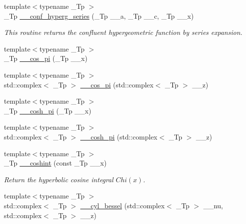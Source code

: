 \begin{DoxyCompactItemize}
{\footnotesize template$<$typename \+\_\+\+Tp $>$ }\\\+\_\+\+Tp \hyperlink{namespacestd_1_1____detail_a5f701a63e17238132405dd209660fc1d}{\+\_\+\+\_\+conf\+\_\+hyperg\+\_\+series} (\+\_\+\+Tp \+\_\+\+\_\+a, \+\_\+\+Tp \+\_\+\+\_\+c, \+\_\+\+Tp \+\_\+\+\_\+x)
\begin{DoxyCompactList}\small\item\em This routine returns the confluent hypergeometric function by series expansion. \end{DoxyCompactList}\item 
{\footnotesize template$<$typename \+\_\+\+Tp $>$ }\\\+\_\+\+Tp \hyperlink{namespacestd_1_1____detail_abfdaa500e1321747a0ad391ca3416a0b}{\+\_\+\+\_\+cos\+\_\+pi} (\+\_\+\+Tp \+\_\+\+\_\+x)
\item 
{\footnotesize template$<$typename \+\_\+\+Tp $>$ }\\std\+::complex$<$ \+\_\+\+Tp $>$ \hyperlink{namespacestd_1_1____detail_a0332c7fb29ed7be543103adc8d04d39d}{\+\_\+\+\_\+cos\+\_\+pi} (std\+::complex$<$ \+\_\+\+Tp $>$ \+\_\+\+\_\+z)
\item 
{\footnotesize template$<$typename \+\_\+\+Tp $>$ }\\\+\_\+\+Tp \hyperlink{namespacestd_1_1____detail_ae6e440447e88191b3cd19daaf7fda96e}{\+\_\+\+\_\+cosh\+\_\+pi} (\+\_\+\+Tp \+\_\+\+\_\+x)
\item 
{\footnotesize template$<$typename \+\_\+\+Tp $>$ }\\std\+::complex$<$ \+\_\+\+Tp $>$ \hyperlink{namespacestd_1_1____detail_a257e13bd4fa9711a87ea68a783ee40d9}{\+\_\+\+\_\+cosh\+\_\+pi} (std\+::complex$<$ \+\_\+\+Tp $>$ \+\_\+\+\_\+z)
\item 
{\footnotesize template$<$typename \+\_\+\+Tp $>$ }\\\+\_\+\+Tp \hyperlink{namespacestd_1_1____detail_ad48a89a591f7b58a047f072e6e383663}{\+\_\+\+\_\+coshint} (const \+\_\+\+Tp \+\_\+\+\_\+x)
\begin{DoxyCompactList}\small\item\em Return the hyperbolic cosine integral $ Chi(x) $. \end{DoxyCompactList}\item 
{\footnotesize template$<$typename \+\_\+\+Tp $>$ }\\std\+::complex$<$ \+\_\+\+Tp $>$ \hyperlink{namespacestd_1_1____detail_ac4cff6a34fbd90932b47ecdb2445dee2}{\+\_\+\+\_\+cyl\+\_\+bessel} (std\+::complex$<$ \+\_\+\+Tp $>$ \+\_\+\+\_\+nu, std\+::complex$<$ \+\_\+\+Tp $>$ \+\_\+\+\_\+z)

\end{DoxyCompactItemize}
